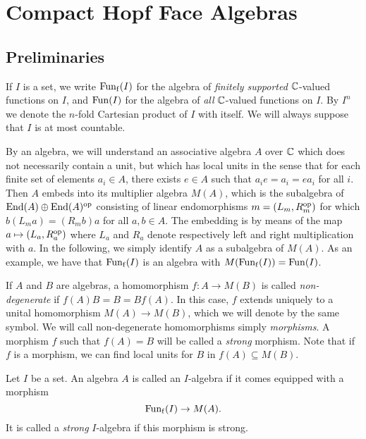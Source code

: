 \section{Compact Hopf Face Algebras}


\subsection{Preliminaries}


If $I$ is a set, we write $\mathrm{Fun}_{\operatorname{\mathrm{f}}}(I)$ for the algebra of
\emph{finitely supported} $\mathbb{C}$-valued functions on $I$, and $\mathrm{Fun}(I)$
for the algebra of \emph{all} $\mathbb{C}$-valued functions on $I$. By $I^n$
we denote the $n$-fold Cartesian product of $I$ with itself. We will
always suppose that $I$ is at most countable.

By an algebra, we will understand an associative algebra $A$ over $\mathbb{C}$
which does not necessarily contain a unit, but which has local units
in the sense that for each finite set of elements $a_i\in A$, there
exists $e\in A$ such that $a_ie=a_i=ea_i$ for all $i$. Then $A$ embeds
into its multiplier algebra $M(A)$, which is the subalgebra of
$\operatorname{\mathrm{End}}(A)\oplus \operatorname{\mathrm{End}}(A)^{\operatorname{\mathrm{op}}}$ consisting of linear endomorphisms $m =
(L_m,R_m^{\operatorname{\mathrm{op}}})$ for which $b(L_ma) = (R_mb)a$ for all $a,b\in A$. The
embedding is by means of the map $a \mapsto (L_a,R_a^{\operatorname{\mathrm{op}}})$ where
$L_a$ and $R_a$ denote respectively left and right multiplication with
$a$. In the following, we simply identify $A$ as a subalgebra of
$M(A)$. As an example, we have that $\mathrm{Fun}_{\operatorname{\mathrm{f}}}(I)$ is an algebra
with $M(\mathrm{Fun}_{\operatorname{\mathrm{f}}}(I)) = \mathrm{Fun}(I)$.

If $A$ and $B$ are algebras, a homomorphism $f:A\rightarrow M(B)$ is
called \emph{non-degenerate} if $f(A)B = B = Bf(A)$. In this case, $f$
extends uniquely to a unital homomorphism $M(A)\rightarrow M(B)$,
which we will denote by the same symbol. We will call non-degenerate
homomorphisms simply \emph{morphisms}. A morphism $f$ such that
$f(A)=B$ will be called a \emph{strong} morphism. Note that if $f$ is
a morphism, we can find local units for $B$ in $f(A)\subseteq M(B)$.

\begin{Def} Let $I$ be a set. An algebra $A$ is called an $I$-algebra
  if it comes equipped with a morphism \[\mathrm{Fun}_{\operatorname{\mathrm{f}}}(I) \rightarrow
  M(A).\] It is called a \emph{strong} $I$-algebra if this morphism is
  strong.
\end{Def}

